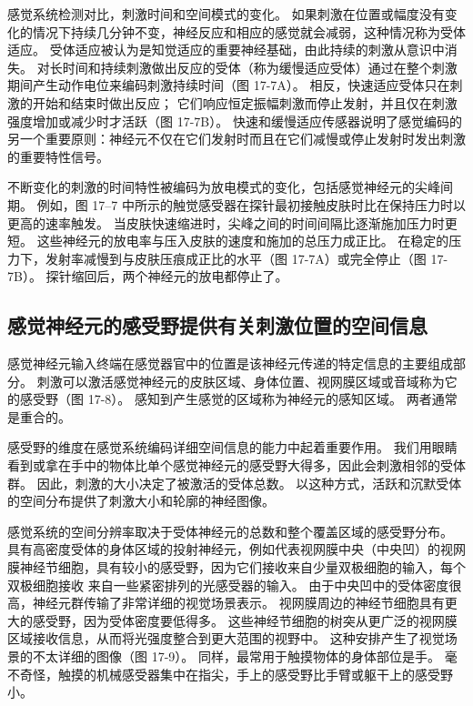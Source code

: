 感觉系统检测对比，刺激时间和空间模式的变化。 如果刺激在位置或幅度没有变化的情况下持续几分钟不变，神经反应和相应的感觉就会减弱，这种情况称为受体适应。 受体适应被认为是知觉适应的重要神经基础，由此持续的刺激从意识中消失。 对长时间和持续刺激做出反应的受体（称为缓慢适应受体）通过在整个刺激期间产生动作电位来编码刺激持续时间（图 17-7A）。 相反，快速适应受体只在刺激的开始和结束时做出反应； 它们响应恒定振幅刺激而停止发射，并且仅在刺激强度增加或减少时才活跃（图 17-7B）。 快速和缓慢适应传感器说明了感觉编码的另一个重要原则：神经元不仅在它们发射时而且在它们减慢或停止发射时发出刺激的重要特性信号。

不断变化的刺激的时间特性被编码为放电模式的变化，包括感觉神经元的尖峰间期。 例如，图 17–7 中所示的触觉感受器在探针最初接触皮肤时比在保持压力时以更高的速率触发。 当皮肤快速缩进时，尖峰之间的时间间隔比逐渐施加压力时更短。 这些神经元的放电率与压入皮肤的速度和施加的总压力成正比。 在稳定的压力下，发射率减慢到与皮肤压痕成正比的水平（图 17-7A）或完全停止（图 17-7B）。 探针缩回后，两个神经元的放电都停止了。

\subsection{感觉神经元的感受野提供有关刺激位置的空间信息}

感觉神经元输入终端在感觉器官中的位置是该神经元传递的特定信息的主要组成部分。 刺激可以激活感觉神经元的皮肤区域、身体位置、视网膜区域或音域称为它的感受野（图 17-8）。 感知到产生感觉的区域称为神经元的感知区域。 两者通常是重合的。

感受野的维度在感觉系统编码详细空间信息的能力中起着重要作用。 我们用眼睛看到或拿在手中的物体比单个感觉神经元的感受野大得多，因此会刺激相邻的受体群。 因此，刺激的大小决定了被激活的受体总数。 以这种方式，活跃和沉默受体的空间分布提供了刺激大小和轮廓的神经图像。

感觉系统的空间分辨率取决于受体神经元的总数和整个覆盖区域的感受野分布。 具有高密度受体的身体区域的投射神经元，例如代表视网膜中央（中央凹）的视网膜神经节细胞，具有较小的感受野，因为它们接收来自少量双极细胞的输入，每个双极细胞接收 来自一些紧密排列的光感受器的输入。 由于中央凹中的受体密度很高，神经元群传输了非常详细的视觉场景表示。 视网膜周边的神经节细胞具有更大的感受野，因为受体密度要低得多。 这些神经节细胞的树突从更广泛的视网膜区域接收信息，从而将光强度整合到更大范围的视野中。 这种安排产生了视觉场景的不太详细的图像（图 17-9）。 同样，最常用于触摸物体的身体部位是手。 毫不奇怪，触摸的机械感受器集中在指尖，手上的感受野比手臂或躯干上的感受野小。



